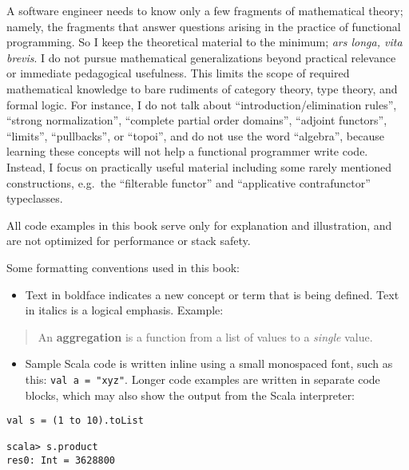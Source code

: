 A software engineer needs to know only a few fragments of mathematical
theory; namely, the fragments that answer questions arising in the
practice of functional programming. So I keep the theoretical material
to the minimum; \emph{ars longa, vita brevis}. I do not pursue mathematical
generalizations beyond practical relevance or immediate pedagogical
usefulness. This limits the scope of required mathematical knowledge
to bare rudiments of category theory, type theory, and formal logic.
For instance, I do not talk about ``introduction/elimination rules'',
``strong normalization'', ``complete partial order domains'',
``adjoint functors'', ``limits'', ``pullbacks'', or ``topoi'',
and do not use the word ``algebra'', because learning these concepts
will not help a functional programmer write code. Instead, I focus
on practically useful material \textendash{} including some rarely
mentioned constructions, e.g.~the ``filterable functor'' and ``applicative
contrafunctor'' typeclasses.

All code examples in this book serve only for explanation and illustration,
and are not optimized for performance or stack safety.

Some formatting conventions used in this book:
\begin{itemize}
\item Text in boldface indicates a new concept or term that is being defined.
Text in italics is a logical emphasis. Example:
\end{itemize}
\begin{quotation}
An \textbf{aggregation} is a function from a list
of values to a \emph{single} value.
\end{quotation}
\begin{itemize}
\item Sample Scala code is written inline using a small monospaced font,
such as this: \lstinline!val a = "xyz"!. Longer code examples are
written in separate code blocks, which may also show the output from
the Scala interpreter:
\end{itemize}
\begin{lstlisting}
val s = (1 to 10).toList

scala> s.product
res0: Int = 3628800 
\end{lstlisting}

